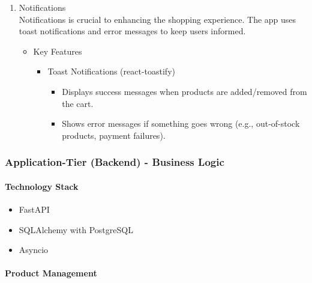 \documentclass{llncs}
\begin{document}
\begin{enumerate}
        \item Notifications\\
        Notifications is crucial to enhancing the shopping experience. The app uses toast notifications and error messages to keep users informed.
            \begin{itemize}
                \item Key Features 
                \begin{itemize}
                    \item Toast Notifications (react-toastify)
                    \begin{itemize}
                        \item Displays success messages when products are added/removed from the cart.
                        \item Shows error messages if something goes wrong (e.g., out-of-stock products, payment failures).\\
                    \end{itemize}
                \end{itemize}
            \end{itemize}
    \end{enumerate}
    
\subsubsection{Application-Tier (Backend) - Business Logic}
\paragraph{Technology Stack}
    \begin{itemize}
        \item FastAPI
        \item SQLAlchemy with PostgreSQL
        \item Asyncio
    \end{itemize}

\paragraph{Product Management} \leavevmode
\end{document}
